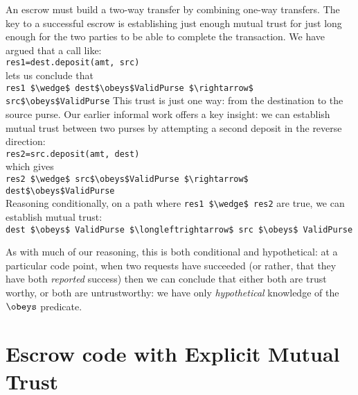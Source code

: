 
An escrow must build a two-way transfer by combining one-way
transfers.  The key to a successful escrow is establishing just enough
mutual trust for just long enough for the two parties to be able to
complete the transaction.  We have argued that
a call like:\\
%
\SP \lstinline+res1=dest.deposit(amt, src)+\\
%
\noindent lets us conclude that\\
%
\SP \lstinline+res1 $\wedge$ dest$\obeys$ValidPurse $\rightarrow$ src$\obeys$ValidPurse+
%
This trust
is
just one way: from the destination to the source purse.
Our earlier informal work
\cite{capeFTfJP14} offers  a key insight: we can
establish mutual trust between two purses by attempting a second
deposit in the reverse direction:\\
%
\SP \lstinline+res2=src.deposit(amt, dest)+\\
%
\noindent which gives\\
%
\SP  \lstinline+res2 $\wedge$ src$\obeys$ValidPurse $\rightarrow$ dest$\obeys$ValidPurse+\\
%
\noindent Reasoning conditionally, on a path where \lstinline+res1 $\wedge$ res2+ are
true, we can establish mutual trust:\\
%
\SP    \lstinline+dest $\obeys$ ValidPurse $\longleftrightarrow$ src $\obeys$ ValidPurse+
%


As with much of our reasoning, this is both conditional and
hypothetical: at a particular code point, when two 
requests have succeeded (or rather, that they have both
\textit{reported} success) then we can conclude that either both are
trust worthy, or both are untrustworthy: we have only {\em hypothetical}
knowledge of the $\obeys$ predicate.


\section{Escrow code with Explicit Mutual Trust}
\label{sec:mutual-trust}


